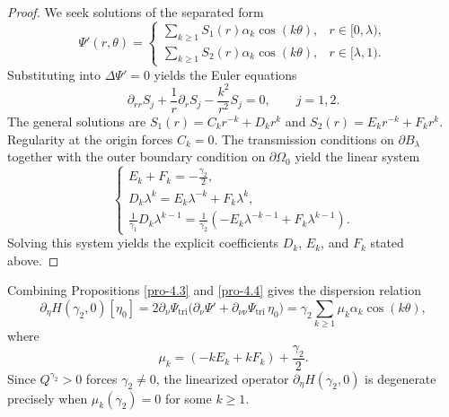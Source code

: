 \documentclass[reqno]{amsart}
\numberwithin{equation}{section}
\numberwithin{equation}{section}
\numberwithin{equation}{section}
\begin{document}
\begin{proof}
We seek solutions of the separated form
\[
\Psi'(r,\theta) =
\begin{cases}
\sum_{k \geq 1} S_1(r) \alpha_k \cos(k\theta), & r \in [0,\lambda), \\
\sum_{k \geq 1} S_2(r) \alpha_k \cos(k\theta), & r \in [\lambda,1).
\end{cases}
\]
Substituting into \(\Delta \Psi' = 0\) yields the Euler equations
\begin{equation}
\partial_{rr}S_j + \frac{1}{r} \partial_{r}S_j - \frac{k^2}{r^2} S_j = 0, \qquad j=1,2. \nonumber
\end{equation}
The general solutions are \(S_1(r) = C_k r^{-k} + D_k r^k\) and \(S_2(r) = E_k r^{-k} + F_k r^k\). Regularity at the origin forces \(C_k = 0\). The transmission conditions on \(\partial B_\lambda\) together with the outer boundary condition on \(\partial \Omega_0\) yield the linear system
\[
\begin{cases}
E_k + F_k = -\frac{\gamma_2}{2}, \\
D_k \lambda^k = E_k \lambda^{-k} + F_k \lambda^k, \\
\frac{1}{\gamma_1} D_k \lambda^{k-1} = \frac{1}{\gamma_2} (-E_k \lambda^{-k-1} + F_k \lambda^{k-1}).
\end{cases}
\]
Solving this system yields the explicit coefficients \(D_k\), \(E_k\), and \(F_k\) stated above.
\end{proof}

Combining Propositions \ref{pro-4.3} and \ref{pro-4.4} gives the dispersion relation
\begin{equation}
\partial_\eta H(\gamma_2,0)[\eta_0] = 2 \partial_\nu \Psi_\mathrm{tri} \bigl( \partial_\nu \Psi' + \partial_{\nu\nu} \Psi_\mathrm{tri} \, \eta_0 \bigr) = \gamma_2 \sum_{k \geq 1} \mu_k \alpha_k \cos(k\theta), \nonumber
\end{equation}
where
\begin{equation}\label{e4.9}
\mu_k = (-k E_k + k F_k) + \frac{\gamma_2}{2}.
\end{equation}
Since \(Q^{\gamma_2} > 0\) forces \(\gamma_2 \neq 0\), the linearized operator \(\partial_\eta H(\gamma_2,0)\) is degenerate precisely when \(\mu_k(\gamma_2) = 0\) for some \(k \geq 1\).
\end{document}
